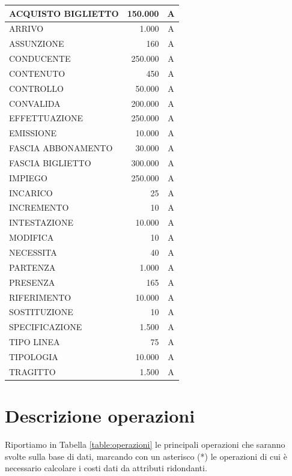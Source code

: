 \documentclass[12pt,a4paper]{report}
\begin{document}
\begin{longtable}{|p{7.5cm}|r|c|}
\hline
ACQUISTO BIGLIETTO & 150.000 & A \\
\hline
ARRIVO & 1.000 & A \\
\hline
ASSUNZIONE & 160 & A \\
\hline
CONDUCENTE & 250.000 & A \\
\hline
CONTENUTO & 450 & A \\
\hline
CONTROLLO & 50.000 & A \\
\hline
CONVALIDA & 200.000 & A \\
\hline
EFFETTUAZIONE & 250.000 & A \\
\hline
EMISSIONE & 10.000 & A \\
\hline
FASCIA ABBONAMENTO & 30.000 & A \\
\hline
FASCIA BIGLIETTO & 300.000 & A \\
\hline
IMPIEGO & 250.000 & A \\
\hline
INCARICO & 25 & A \\
\hline
INCREMENTO & 10 & A \\
\hline
INTESTAZIONE & 10.000 & A \\
\hline
MODIFICA & 10 & A \\
\hline
NECESSITA & 40 & A \\
\hline
PARTENZA & 1.000 & A \\
\hline
PRESENZA & 165 & A \\
\hline
RIFERIMENTO & 10.000 & A \\
\hline
SOSTITUZIONE & 10 & A \\
\hline
SPECIFICAZIONE & 1.500 & A \\
\hline
TIPO LINEA & 75 & A \\
\hline
TIPOLOGIA & 10.000 & A \\
\hline
TRAGITTO & 1.500 & A \\
\hline
\end{longtable}


\section{Descrizione operazioni}
Riportiamo in Tabella \ref{table:operazioni} le principali operazioni che saranno svolte sulla base di dati, marcando con un asterisco (*) le operazioni di cui è necessario calcolare i costi dati da attributi ridondanti.
\end{document}
